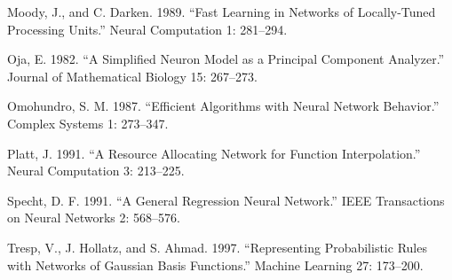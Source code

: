 Moody, J., and C. Darken. 1989. “Fast Learning in Networks of Locally-Tuned Processing Units.” Neural Computation 1: 281--294.

Oja, E. 1982. “A Simplified Neuron Model as a Principal Component Analyzer.” Journal of Mathematical Biology 15: 267--273.

Omohundro, S. M. 1987. “Efficient Algorithms with Neural Network Behavior.” Complex Systems 1: 273--347.

Platt, J. 1991. “A Resource Allocating Network for Function Interpolation.” Neural Computation 3: 213--225.

Specht, D. F. 1991. “A General Regression Neural Network.” IEEE Transactions on Neural Networks 2: 568--576.

Tresp, V., J. Hollatz, and S. Ahmad. 1997. “Representing Probabilistic Rules with Networks of Gaussian Basis Functions.” Machine Learning 27: 173--200.
